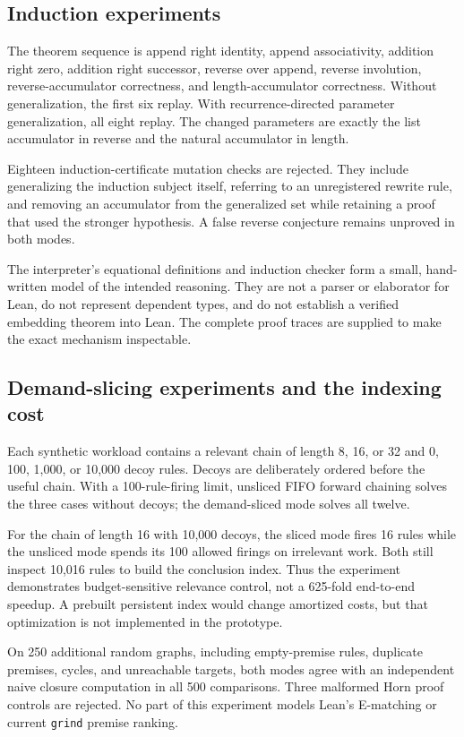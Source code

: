 \documentclass[11pt,letterpaper]{article}
\newcommand{\Lean}{\textsf{Lean}}
\newcommand{\grind}{\texttt{grind}}
\theoremstyle{definition}
\theoremstyle{remark}
\begin{document}
\subsection{Induction experiments}
The theorem sequence is append right identity, append associativity, addition right zero, addition right successor, reverse over append, reverse involution, reverse-accumulator correctness, and length-accumulator correctness. Without generalization, the first six replay. With recurrence-directed parameter generalization, all eight replay. The changed parameters are exactly the list accumulator in reverse and the natural accumulator in length.

Eighteen induction-certificate mutation checks are rejected. They include generalizing the induction subject itself, referring to an unregistered rewrite rule, and removing an accumulator from the generalized set while retaining a proof that used the stronger hypothesis. A false reverse conjecture remains unproved in both modes.

The interpreter's equational definitions and induction checker form a small, hand-written model of the intended reasoning. They are not a parser or elaborator for \Lean{}, do not represent dependent types, and do not establish a verified embedding theorem into \Lean{}. The complete proof traces are supplied to make the exact mechanism inspectable.

\subsection{Demand-slicing experiments and the indexing cost}
Each synthetic workload contains a relevant chain of length 8, 16, or 32 and 0, 100, 1,000, or 10,000 decoy rules. Decoys are deliberately ordered before the useful chain. With a 100-rule-firing limit, unsliced FIFO forward chaining solves the three cases without decoys; the demand-sliced mode solves all twelve.

For the chain of length 16 with 10,000 decoys, the sliced mode fires 16 rules while the unsliced mode spends its 100 allowed firings on irrelevant work. Both still inspect 10,016 rules to build the conclusion index. Thus the experiment demonstrates budget-sensitive relevance control, not a 625-fold end-to-end speedup. A prebuilt persistent index would change amortized costs, but that optimization is not implemented in the prototype.

On 250 additional random graphs, including empty-premise rules, duplicate premises, cycles, and unreachable targets, both modes agree with an independent naive closure computation in all 500 comparisons. Three malformed Horn proof controls are rejected. No part of this experiment models \Lean's E-matching or current \grind{} premise ranking.
\end{document}
